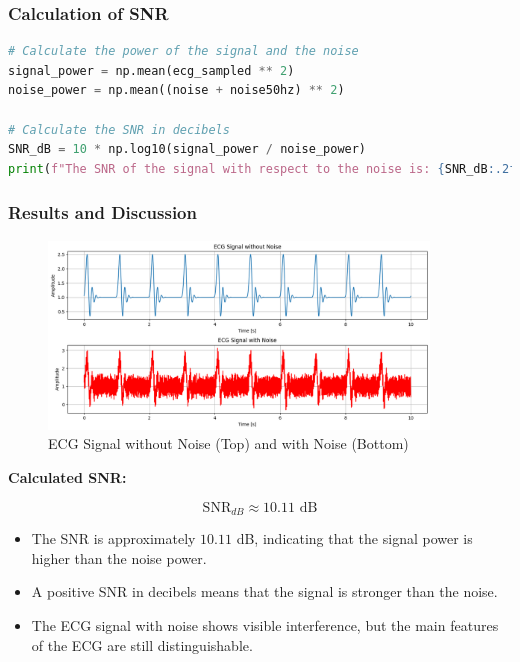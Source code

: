 \documentclass[10pt]{article}
\theoremstyle{definition}
\theoremstyle{remark}
\theoremstyle{definition}
\numberwithin{equation}{prob}
\begin{document}
\subsubsection*{Calculation of SNR}

\begin{lstlisting}[language=Python]
# Calculate the power of the signal and the noise
signal_power = np.mean(ecg_sampled ** 2)
noise_power = np.mean((noise + noise50hz) ** 2)

# Calculate the SNR in decibels
SNR_dB = 10 * np.log10(signal_power / noise_power)
print(f"The SNR of the signal with respect to the noise is: {SNR_dB:.2f} dB")
\end{lstlisting}

\subsubsection*{Results and Discussion}

\begin{figure}[H]
    \centering
    \includegraphics[width=0.9\textwidth]{./figures/ecg_signals.png}
    \caption{ECG Signal without Noise (Top) and with Noise (Bottom)}
\end{figure}

\textbf{Calculated SNR:}

\[
\text{SNR}_{dB} \approx 10.11 \text{ dB}
\]

\begin{itemize}
	\item The SNR is approximately \(10.11\) dB, indicating that the signal power is higher than the noise power.
	\item A positive SNR in decibels means that the signal is stronger than the noise.
	\item The ECG signal with noise shows visible interference, but the main features of the ECG are still distinguishable.
\end{itemize}
\end{document}

